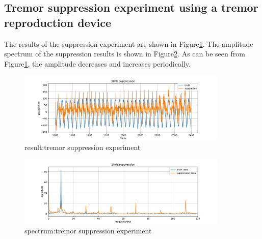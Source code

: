 \subsection{ Tremor suppression experiment using a tremor reproduction device}\label{subsection:eval:suppression_experiment}



The results of the suppression experiment are shown in Figure\ref{figure:saupp_eval:10Hz_supp}.
The amplitude spectrum of the suppression results is shown in Figure\ref{figure:saupp_eval:10Hz_supp_fft}.
As can be seen from Figure\ref{figure:saupp_eval:10Hz_supp},
the amplitude decreases and increases periodically.


  \begin{figure}[tb]
    \centering
    \includegraphics[width = 10cm,pagebox=cropbox,clip]{img/suppression_result.pdf}
    \caption{result:tremor suppression experiment}
    \label{figure:saupp_eval:10Hz_supp}
  \end{figure}
  
  \begin{figure}[tb]
    \centering
    \includegraphics[width = 10cm,pagebox=cropbox,clip]{img/suppression_result_fft.pdf}
    \caption{spectrum:tremor suppression experiment}
    \label{figure:saupp_eval:10Hz_supp_fft}
  \end{figure}
